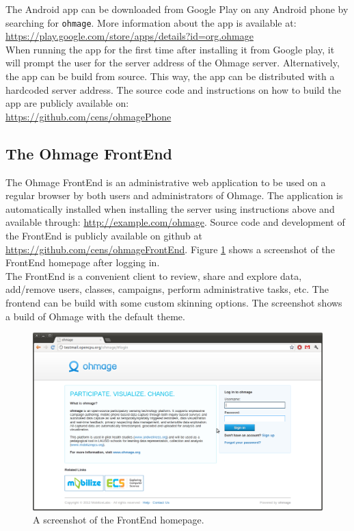 \documentclass{scrartcl}
\begin{document}
\noindent The Android app can be downloaded from Google Play on any
Android phone by searching for \texttt{ohmage}. More information about the
app is available at: \\

\url{https://play.google.com/store/apps/details?id=org.ohmage} \\

When running the app for the first time after installing it from Google play, it
will prompt the user for the server address of the Ohmage server.
Alternatively, the app can be build from source. This way, the app can be
distributed with a hardcoded server address. The source code and instructions on
how to build the app are publicly available on: \\

\url{https://github.com/cens/ohmagePhone} \\

\subsection{The Ohmage FrontEnd}

The Ohmage FrontEnd is an administrative web application to be used on a regular
browser by both users and administrators of Ohmage. The application is
automatically installed when installing the server using instructions above and
available through: \url{http://example.com/ohmage}. Source code and
development of the FrontEnd is publicly available on github at
\url{https://github.com/cens/ohmageFrontEnd}. Figure \ref{fig:frontend} shows a
screenshot of the FrontEnd homepage after logging in. \\

\noindent The FrontEnd is a convenient client to review, share and explore data,
add/remove users, classes, campaigns, perform administrative tasks, etc. The
frontend can be build with some custom skinning options. The screenshot shows a build of
Ohmage with the default theme.

\begin{figure}[h!]
\begin{center}
\includegraphics[width=15cm]{frontend.png}
\caption{A screenshot of the FrontEnd homepage.}
\label{fig:frontend}
\end{center}
\end{figure}
\end{document}
